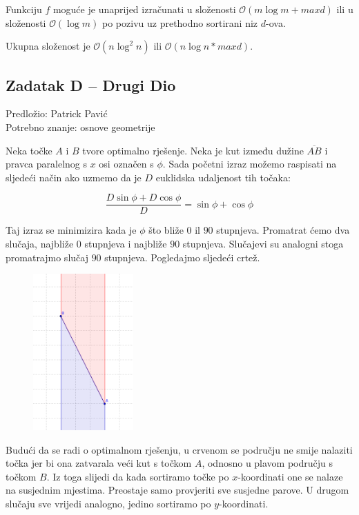 \documentclass[a4paper]{article}
\begin{document}
Funkciju $f$ moguće je unaprijed izračunati u složenosti $\mathcal{O}(m \log m
+ maxd)$ ili u složenosti $\mathcal{O}(\log m)$ po pozivu uz prethodno
sortirani niz $d$-ova.

Ukupna složenost je $\mathcal{O}(n \log^2 n)$ ili $\mathcal{O}(n \log n * maxd)$.

\subsection*{Zadatak D -- Drugi Dio}
\textsf{Predložio: Patrick Pavić}\\
\textsf{Potrebno znanje: osnove geometrije}

Neka točke $A$ i $B$ tvore optimalno rješenje. Neka je kut između dužine $\overline{AB}$ i
pravca paralelnog s $x$ osi označen s $\phi$. Sada početni izraz možemo raspisati na
sljedeći način ako uzmemo da je $D$ euklidska udaljenost tih točaka:

  \[\frac{D \sin \phi + D \cos \phi}{D} = \sin \phi + \cos \phi\]


Taj izraz se minimizira kada je $\phi$ što bliže $0$ il $90$ stupnjeva. Promatrat
ćemo dva slučaja, najbliže $0$ stupnjeva i najbliže $90$ stupnjeva. Slučajevi su
analogni stoga promatrajmo slučaj $90$ stupnjeva. Pogledajmo sljedeći crtež.

\begin{figure}[h]
  \centering
  \includegraphics[height=6cm]{pic/D_edit.png}
\end{figure}


Budući da se radi o optimalnom rješenju, u crvenom se području ne smije
nalaziti točka jer bi ona zatvarala veći kut s točkom $A$, odnosno u plavom
području s točkom $B$. Iz toga slijedi da kada sortiramo točke po
$x$-koordinati one se nalaze na susjednim mjestima. Preostaje samo provjeriti
sve susjedne parove. U drugom slučaju sve vrijedi analogno, jedino sortiramo po
$y$-koordinati.
\end{document}
